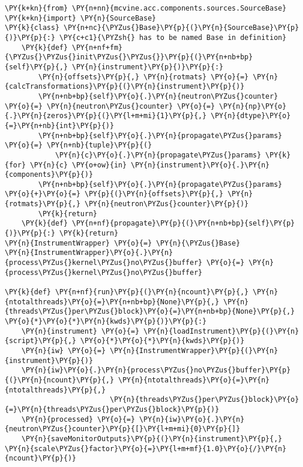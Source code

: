 \begin{Verbatim}[commandchars=\\\{\},fontsize=\tiny]
\PY{k+kn}{from} \PY{n+nn}{mcvine.acc.components.sources.SourceBase} \PY{k+kn}{import} \PY{n}{SourceBase}
\PY{k}{class} \PY{n+nc}{\PYZus{}Base}\PY{p}{(}\PY{n}{SourceBase}\PY{p}{)}\PY{p}{:} \PY{c+c1}{\PYZsh{} has to be named Base in definition}
    \PY{k}{def} \PY{n+nf+fm}{\PYZus{}\PYZus{}init\PYZus{}\PYZus{}}\PY{p}{(}\PY{n+nb+bp}{self}\PY{p}{,} \PY{n}{instrument}\PY{p}{)}\PY{p}{:}
        \PY{n}{offsets}\PY{p}{,} \PY{n}{rotmats} \PY{o}{=} \PY{n}{calcTransformations}\PY{p}{(}\PY{n}{instrument}\PY{p}{)}
        \PY{n+nb+bp}{self}\PY{o}{.}\PY{n}{neutron\PYZus{}counter} \PY{o}{=} \PY{n}{neutron\PYZus{}counter} \PY{o}{=} \PY{n}{np}\PY{o}{.}\PY{n}{zeros}\PY{p}{(}\PY{l+m+mi}{1}\PY{p}{,} \PY{n}{dtype}\PY{o}{=}\PY{n+nb}{int}\PY{p}{)}
        \PY{n+nb+bp}{self}\PY{o}{.}\PY{n}{propagate\PYZus{}params} \PY{o}{=} \PY{n+nb}{tuple}\PY{p}{(}
            \PY{n}{c}\PY{o}{.}\PY{n}{propagate\PYZus{}params} \PY{k}{for} \PY{n}{c} \PY{o+ow}{in} \PY{n}{instrument}\PY{o}{.}\PY{n}{components}\PY{p}{)}
        \PY{n+nb+bp}{self}\PY{o}{.}\PY{n}{propagate\PYZus{}params} \PY{o}{+}\PY{o}{=} \PY{p}{(}\PY{n}{offsets}\PY{p}{,} \PY{n}{rotmats}\PY{p}{,} \PY{n}{neutron\PYZus{}counter}\PY{p}{)}
        \PY{k}{return}
    \PY{k}{def} \PY{n+nf}{propagate}\PY{p}{(}\PY{n+nb+bp}{self}\PY{p}{)}\PY{p}{:} \PY{k}{return}
\PY{n}{InstrumentWrapper} \PY{o}{=} \PY{n}{\PYZus{}Base}
\PY{n}{InstrumentWrapper}\PY{o}{.}\PY{n}{process\PYZus{}kernel\PYZus{}no\PYZus{}buffer} \PY{o}{=} \PY{n}{process\PYZus{}kernel\PYZus{}no\PYZus{}buffer}

\PY{k}{def} \PY{n+nf}{run}\PY{p}{(}\PY{n}{ncount}\PY{p}{,} \PY{n}{ntotalthreads}\PY{o}{=}\PY{n+nb+bp}{None}\PY{p}{,} \PY{n}{threads\PYZus{}per\PYZus{}block}\PY{o}{=}\PY{n+nb+bp}{None}\PY{p}{,} \PY{o}{*}\PY{o}{*}\PY{n}{kwds}\PY{p}{)}\PY{p}{:}
    \PY{n}{instrument} \PY{o}{=} \PY{n}{loadInstrument}\PY{p}{(}\PY{n}{script}\PY{p}{,} \PY{o}{*}\PY{o}{*}\PY{n}{kwds}\PY{p}{)}
    \PY{n}{iw} \PY{o}{=} \PY{n}{InstrumentWrapper}\PY{p}{(}\PY{n}{instrument}\PY{p}{)}
    \PY{n}{iw}\PY{o}{.}\PY{n}{process\PYZus{}no\PYZus{}buffer}\PY{p}{(}\PY{n}{ncount}\PY{p}{,} \PY{n}{ntotalthreads}\PY{o}{=}\PY{n}{ntotalthreads}\PY{p}{,}
                         \PY{n}{threads\PYZus{}per\PYZus{}block}\PY{o}{=}\PY{n}{threads\PYZus{}per\PYZus{}block}\PY{p}{)}
    \PY{n}{processed} \PY{o}{=} \PY{n}{iw}\PY{o}{.}\PY{n}{neutron\PYZus{}counter}\PY{p}{[}\PY{l+m+mi}{0}\PY{p}{]}
    \PY{n}{saveMonitorOutputs}\PY{p}{(}\PY{n}{instrument}\PY{p}{,} \PY{n}{scale\PYZus{}factor}\PY{o}{=}\PY{l+m+mf}{1.0}\PY{o}{/}\PY{n}{ncount}\PY{p}{)}
\end{Verbatim}
